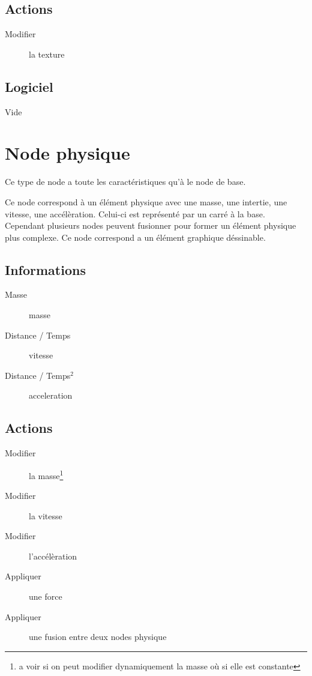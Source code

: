 \documentclass[11pt, a4paper]{article}
\begin{document}
\subsection{Actions}
\begin{description}
\item[Modifier] la texture
\end{description}

\subsection{Logiciel}
Vide

\section{Node physique}
Ce type de node a toute les caractéristiques qu'à le node de base.

Ce node correspond à un élément physique avec une masse, une intertie, une vitesse, une accélèration.
Celui-ci est représenté par un carré à la base. Cependant plusieurs nodes peuvent fusionner pour former un élément physique plus complexe.
Ce node correspond a un élément graphique déssinable.

\subsection{Informations}
\begin{description}
\item[Masse] masse
\item[Distance / Temps] vitesse
\item[Distance / Temps$^2$] acceleration
\end{description}

\subsection{Actions}
\begin{description}
\item[Modifier] la masse\footnote{a voir si on peut modifier dynamiquement la masse où si elle est constante}
\item[Modifier] la vitesse
\item[Modifier] l'accélèration
\item[Appliquer] une force
\item[Appliquer] une fusion entre deux nodes physique
\end{description}
\end{document}
